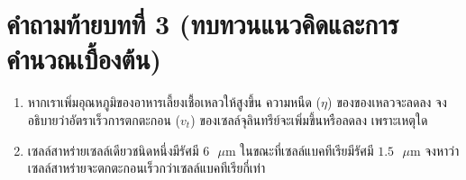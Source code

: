 \section*{คำถามท้ายบทที่ 3 (ทบทวนแนวคิดและการคำนวณเบื้องต้น)}
\begin{enumerate}
    \item หากเราเพิ่มอุณหภูมิของอาหารเลี้ยงเชื้อเหลวให้สูงขึ้น ความหนืด ($\eta$) ของของเหลวจะลดลง จงอธิบายว่าอัตราเร็วการตกตะกอน ($v_t$) ของเซลล์จุลินทรีย์จะเพิ่มขึ้นหรือลดลง เพราะเหตุใด
    \item เซลล์สาหร่ายเซลล์เดียวชนิดหนึ่งมีรัศมี $6\text{ }\mu\text{m}$ ในขณะที่เซลล์แบคทีเรียมีรัศมี $1.5\text{ }\mu\text{m}$ จงหาว่าเซลล์สาหร่ายจะตกตะกอนเร็วกว่าเซลล์แบคทีเรียกี่เท่า
\end{enumerate}
